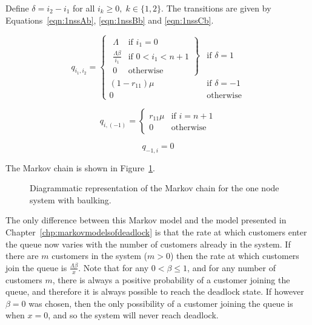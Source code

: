 \documentclass{article}
\begin{document}
Define  $\delta = i_2 - i_1$ for all $i_k \geq 0,\; k \in \{1, 2\}$.
The transitions are given by Equations~\ref{eqn:1nssAb}, \ref{eqn:1nssBb} and \ref{eqn:1nssCb}.

\begin{equation}\label{eqn:1nssAb}
  q_{i_1, i_2} = \left\{
  \begin{array}{rr}
    \left. \begin{array}{rr}
      \Lambda & \text{if } i_1 = 0 \\
      \frac{\Lambda \beta}{i_1} & \text{if } 0 < i_1 < n + 1 \\
      0 & \text{otherwise}
    \end{array} \right\} & \text{if } \delta = 1 \\
    (1 - r_{11})\mu & \text{if } \delta = -1 \\
    0 & \text{otherwise}
  \end{array} \right.
\end{equation}

\begin{equation}\label{eqn:1nssBb}
  q_{i, (-1)} = \left\{
  \begin{array}{rr}
    r_{11}\mu & \text{if } i = n + 1 \\
    0 & \text{otherwise}
  \end{array}
  \right.
\end{equation}

\begin{equation}\label{eqn:1nssCb}
  q_{-1, i} = 0
\end{equation}

The Markov chain is shown in Figure~\ref{fig:1nodeMCbaulking}.

\begin{figure}[!hbtp]
  \begin{center}
    
  \end{center}
  \caption{Diagrammatic representation of the Markov chain for the one node system with baulking.}
  \label{fig:1nodeMCbaulking}
\end{figure}

The only difference between this Markov model and the model presented in Chapter~\ref{chp:markovmodelsofdeadlock} is that the rate at which customers enter the queue now varies with the number of customers already in the system.
If there are $m$ customers in the system ($m > 0$) then the rate at which customers join the queue is $\frac{\Lambda \beta}{x}$.
Note that for any $0 < \beta \leq 1$, and for any number of customers $m$, there is always a positive probability of a customer joining the queue, and therefore it is always possible to reach the deadlock state.
If however $\beta = 0$ was chosen, then the only possibility of a customer joining the queue is when $x = 0$, and so the system will never reach deadlock.
\end{document}
